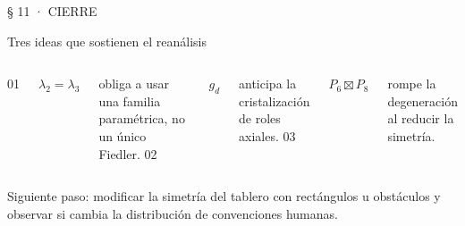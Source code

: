 \documentclass[aspectratio=169,11pt]{beamer}
\newcommand{\currentspeaker}{Thomas Chisica}
\newcommand{\eyebrow}[2][urMid]{%
  {\sffamily\fontsize{7.8pt}{9pt}\selectfont\color{#1}\MakeUppercase{#2}}\par\vspace{0.35em}}
\newcommand{\slidetitle}[2][urInk]{%
  {\rmfamily\fontsize{20.5pt}{23pt}\selectfont\color{#1}#2\par}%
  \vspace{0.18em}{\color{urBlue}\rule{2.35cm}{1.25pt}}\par\vspace{0.48em}}
\newcommand{\bignum}[2]{%
  {\sffamily\scriptsize\color{urMid}\MakeUppercase{#1}}\par
  {\rmfamily\fontsize{29pt}{31pt}\selectfont\color{urBlue}#2\par}}
\begin{document}
\renewcommand{\currentspeaker}{Sara Figueredo Laserna}
\begin{frame}[t]
  \eyebrow{§ 11 · Cierre}
  \slidetitle{Tres ideas que sostienen el reanálisis}
  \begin{columns}[T,onlytextwidth]
      \bignum{01}{$\lambda_2=\lambda_3$}
      {\small obliga a usar una familia paramétrica, no un único Fiedler.}
      \bignum{02}{$g_d$}
      {\small anticipa la cristalización de roles axiales.}
      \bignum{03}{$P_6\boxtimes P_8$}
      {\small rompe la degeneración al reducir la simetría.}
  \end{columns}
  \vspace{1.0em}
  \begin{columns}[T,onlytextwidth]
      {\rmfamily\fontsize{13.5pt}{16pt}\selectfont
      Siguiente paso: modificar la simetría del tablero con rectángulos u obstáculos y observar si cambia la distribución de convenciones humanas.\par}
  \end{columns}
\end{frame}
\end{document}

